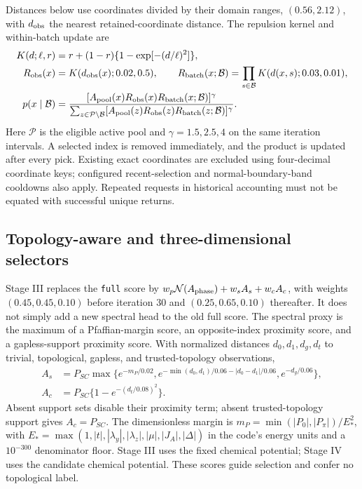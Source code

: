 Distances below use coordinates divided by their domain ranges, $(0.56,2.12)$, with $d_{\rm obs}$ the nearest retained-coordinate distance. The repulsion kernel and within-batch update are
\begin{align}
K(d;\ell,r)&=r+(1-r)\{1-\exp[-(d/\ell)^2]\},\label{eq:kernel}\\
R_{\rm obs}(x)&=K(d_{\rm obs}(x);0.02,0.5),\qquad
R_{\rm batch}(x;\mathcal B)=\prod_{s\in\mathcal B}K(d(x,s);0.03,0.01),\label{eq:repulsion}\\
p(x\mid\mathcal B)&=\frac{[A_{\rm pool}(x)R_{\rm obs}(x)R_{\rm batch}(x;\mathcal B)]^\gamma}
{\sum_{z\in\mathcal P\setminus\mathcal B}[A_{\rm pool}(z)R_{\rm obs}(z)R_{\rm batch}(z;\mathcal B)]^\gamma}.\label{eq:batchprob}
\end{align}
Here $\mathcal P$ is the eligible active pool and $\gamma=1.5,2.5,4$ on the same iteration intervals. A selected index is removed immediately, and the product is updated after every pick. Existing exact coordinates are excluded using four-decimal coordinate keys; configured recent-selection and normal-boundary-band cooldowns also apply. Repeated requests in historical accounting must not be equated with successful unique returns.

\subsection{Topology-aware and three-dimensional selectors}\label{sec:stage-selectors}
Stage III replaces the \texttt{full} score by $w_p\mathcal N(A_{\rm phase})+w_sA_s+w_cA_c$, with weights $(0.45,0.45,0.10)$ before iteration 30 and $(0.25,0.65,0.10)$ thereafter. It does not simply add a new spectral head to the old full score. The spectral proxy is the maximum of a Pfaffian-margin score, an opposite-index proximity score, and a gapless-support proximity score. With normalized distances $d_0,d_1,d_g,d_t$ to trivial, topological, gapless, and trusted-topology observations,
\begin{align}
A_s&=P_{SC}\max\{e^{-m_P/0.02},e^{-\min(d_0,d_1)/0.06-|d_0-d_1|/0.06},e^{-d_g/0.06}\},\label{eq:toposcore}\\
A_c&=P_{SC}\{1-e^{-(d_t/0.08)^2}\}.\label{eq:topocoverage}
\end{align}
Absent support sets disable their proximity term; absent trusted-topology support gives $A_c=P_{SC}$. The dimensionless margin is $m_P=\min(|P_0|,|P_\pi|)/E_*^2$, with $E_*=\max(1,|t|,|\lambda_y|,|\lambda_z|,|\mu|,|J_A|,|\Delta|)$ in the code's energy units and a $10^{-300}$ denominator floor. Stage III uses the fixed chemical potential; Stage IV uses the candidate chemical potential. These scores guide selection and confer no topological label.

